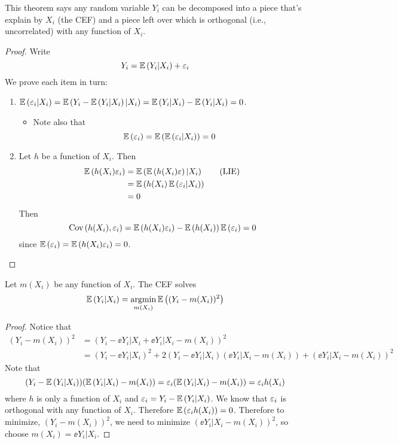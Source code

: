 \documentclass[11pt]{article}
\begin{document}
\begin{interpretation}
	This theorem says any random variable $Y_i$ can be decomposed into a piece that's explain by $X_i$ (the CEF) and a piece left over which is orthogonal (i.e., uncorrelated) with any function of $X_i$. 
\end{interpretation}

\begin{proof}
	Write 
	\begin{equation}
		Y_i = \mathop{{}\mathbb{E}}\left( Y_i|X_i \right) + \varepsilon_i
	\end{equation}
	We prove each item in turn:
	\begin{enumerate}
		\item $\mathop{{}\mathbb{E}}\left( \varepsilon_i|X_i \right) = \mathop{{}\mathbb{E}}\left( Y_i - \mathop{{}\mathbb{E}}\left( Y_i|X_i \right) | X_i \right) = \mathop{{}\mathbb{E}}\left( Y_i|X_i \right) - \mathop{{}\mathbb{E}}\left( Y_i|X_i \right) = 0$. 
		\begin{itemize}
			\item Note also that
			\begin{equation}
				\mathop{{}\mathbb{E}}\left( \varepsilon_i \right) = \mathop{{}\mathbb{E}}\left( \mathop{{}\mathbb{E}}\left( \varepsilon_i|X_i \right) \right) = 0
			\end{equation}
		\end{itemize}
		\item Let $h$ be a function of $X_i$. Then
		\begin{align*}
			\mathop{{}\mathbb{E}}\left( h(X_i)\varepsilon_i \right) &= \mathop{{}\mathbb{E}}\left( \mathop{{}\mathbb{E}}\left( h(X_i)\varepsilon \right)|X_i \right) \tag{LIE} \\
			&= \mathop{{}\mathbb{E}}\left( h(X_i)\mathop{{}\mathbb{E}}\left( \varepsilon_i|X_i \right) \right) \\
			&= 0
		\end{align*}
		Then
		\begin{equation}
			\text{Cov}\left( h(X_i),\varepsilon_i \right) = \mathop{{}\mathbb{E}}\left( h(X_i)\varepsilon_i \right) - \mathop{{}\mathbb{E}}\left( h(X_i) \right)\mathop{{}\mathbb{E}}\left( \varepsilon_i \right) = 0
		\end{equation}
		since $\mathop{{}\mathbb{E}}\left( \varepsilon_i \right) =  \mathop{{}\mathbb{E}}\left( h(X_i)\varepsilon_i \right) = 0$.
	\end{enumerate}
\end{proof}

\begin{theorem}
	Let $m(X_i)$ be any function of $X_i$. The CEF solves
	\begin{equation}
		\ee{Y_i|X_i} = \argmin_{m(X_i)} \ee{(Y_i-m(X_i))^2}
	\end{equation}
\end{theorem}

\begin{proof}
	Notice that
	\begin{align*}
		(Y_i-m(X_i))^2 &= (Y_i - \ee{Y_i|X_i} + \ee{Y_i|X_i} - m(X_i))^2 \\
		&= (Y_i - \ee{Y_i|X_i})^2 + 2(Y_i - \ee{Y_i|X_i})(\ee{Y_i|X_i} - m(X_i)) + (\ee{Y_i|X_i} - m(X_i))^2
	\end{align*}
	Note that
	\begin{equation}
		(Y_i - \mathop{{}\mathbb{E}}\left( Y_i|X_i \right))(\mathop{{}\mathbb{E}}\left( Y_i|X_i \right) - m(X_i)) = \varepsilon_i (\mathop{{}\mathbb{E}}\left( Y_i|X_i \right) - m(X_i)) = \varepsilon_i h(X_i)
	\end{equation}
	where $h$ is only a function of $X_i$ and $\varepsilon_i = Y_i - \mathop{{}\mathbb{E}}\left( Y_i|X_i \right)$. We know that $\varepsilon_i$ is orthogonal with any function of $X_i$. Therefore $\mathop{{}\mathbb{E}}\left( \varepsilon_i h(X_i) \right) = 0$.  Therefore to minimize, $(Y_i-m(X_i))^2$, we need to minimize $(\ee{Y_i|X_i} - m(X_i))^2$, so choose $m(X_i) = \ee{Y_i|X_i}$.
\end{proof}
\end{document}
